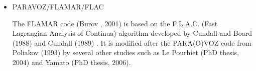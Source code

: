 \begin{itemize}
\begin{scriptsize}
\begin{itemize}
\item[\twothousandeight]     \textcite{daks08},  \textcite{scdk08}
\item[\twothousandnine]      \textcite{gogk09},  \textcite{kalb09}
\item[\twothousandten]       \textcite{krda10},  \textcite{kaus10},  \textcite{dekc10}
\item[\twothousandeleven]    \textcite{yakm11}
\item[\twothousandtwelve]    \textcite{gebk12},  \textcite{rukb12},  \textcite{thka12}
\item[\twothousandthirteen]  \textcite{scpo13}
\item[\twothousandfourteen]  \textcite{jobk14}
\item[\twothousandfifteen]   \textcite{lukz15},  \textcite{gehm15},  \textcite{baka15}, 
                             \textcite{thkp15},  \textcite{musd15}
\item[\twothousandsixteen]   \textcite{jads16},  \textcite{maka16},  \textcite{cakp16}
\item[\twothousandeighteen]  \textcite{dusd18},  \textcite{jasc18},  \textcite{jadg18},
                             \textcite{comj18},  \textcite{jens18},  \textcite{rabw18},
                             \textcite{chsm18}
\item[\twothousandnineteen]  \textcite{sifg19},  \textcite{baba19},
                             \textcite{sogh19},  \textcite{anpa19}
\item[\twothousandtwenty]    \textcite{hube20}
\end{itemize}
\end{scriptsize}

\item PARAVOZ/FLAMAR/FLAC 

The FLAMAR code (Burov \etal, 2001) is based on the
F.L.A.C. (Fast Lagrangian Analysis of Continua) algorithm developed by Cundall and Board (1988) 
and Cundall (1989) \cite{cund89}. It is modified after the PARA(O)VOZ code from 
Poliakov \etal (1993) \cite{pocp93} by several
other studies such as Le Pourhiet (PhD thesis, 2004) and Yamato (PhD thesis, 2006).


\end{itemize}
